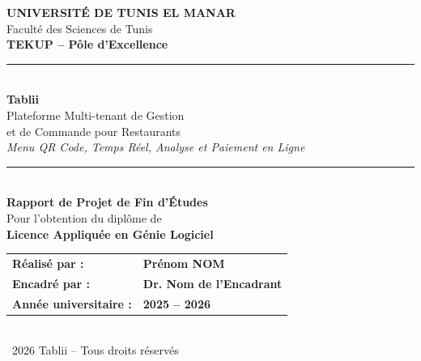 \documentclass[12pt,a4paper]{report}
\begin{document}
\begin{titlepage}
    \centering


    \vspace*{1cm}

    {\Huge\bfseries\color{secondary} UNIVERSITÉ DE TUNIS EL MANAR}\\[0.3cm]
    {\Large\color{secondary} Faculté des Sciences de Tunis}\\[0.2cm]
    {\large\color{primary}\textbf{TEKUP -- Pôle d'Excellence}}\\[1.5cm]

    \rule{0.6\textwidth}{1pt}\\[1cm]

    {\Huge\bfseries\color{primary} Tablii}\\[0.5cm]
    {\LARGE\color{secondary} Plateforme Multi-tenant de Gestion\\et de Commande pour Restaurants}\\[0.5cm]
    {\large\color{accent} \textit{Menu QR Code, Temps Réel, Analyse et Paiement en Ligne}}\\[1cm]

    \rule{0.6\textwidth}{1pt}\\[1.5cm]

    {\Large\bfseries Rapport de Projet de Fin d'Études}\\[0.3cm]
    {\large Pour l'obtention du diplôme de}\\[0.2cm]
    {\large\bfseries Licence Appliquée en Génie Logiciel}\\[1.5cm]

    \begin{tabular}{>{\raggedleft}p{} >{\raggedright}p{}}
        \textbf{Réalisé par :} & \textbf{\large Prénom NOM} \\[0.5cm]
        \textbf{Encadré par :} & \textbf{\large Dr. Nom de l'Encadrant} \\[0.5cm]
        \textbf{Année universitaire :} & \textbf{\large 2025 -- 2026} \\
    \end{tabular}\\[2cm]

    \vfill
    {\small\color{gray} \textcopyright\ 2026 Tablii -- Tous droits réservés}
\end{titlepage}
\end{document}
